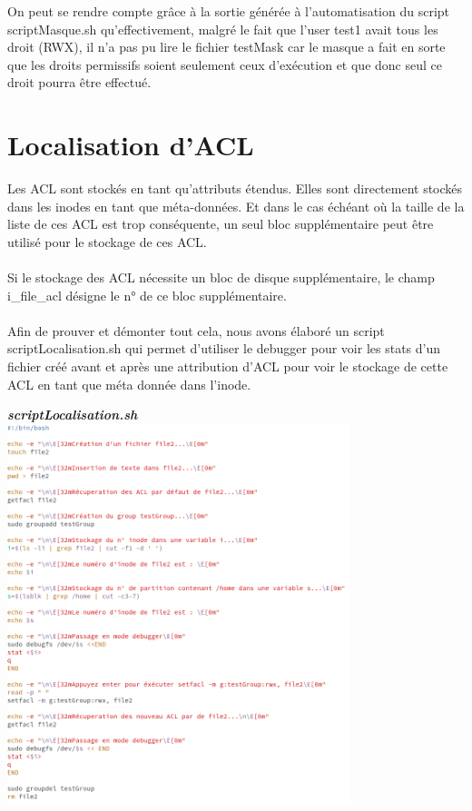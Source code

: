 \documentclass{article}
\begin{document}
On peut se rendre compte grâce à la sortie générée à l'automatisation du script scriptMasque.sh qu'effectivement, malgré le fait que l'user test1 avait tous les droit (RWX), il n'a pas pu lire le fichier testMask car le masque a fait en sorte que les droits permissifs soient seulement ceux d'exécution et que donc seul ce droit pourra être effectué.
\newpage
\section{Localisation d'ACL}
Les ACL sont stockés en tant qu'attributs étendus. Elles sont directement stockés dans les inodes en tant que méta-données. Et dans le cas échéant où la taille de la liste de ces ACL est trop conséquente, un seul bloc supplémentaire peut être utilisé pour le stockage de ces ACL.\\\\
Si le stockage des ACL nécessite un bloc de disque supplémentaire, le champ i\_file\_acl désigne le n° de ce bloc supplémentaire.\\\\
Afin de prouver et démonter tout cela, nous avons élaboré un script scriptLocalisation.sh qui permet d'utiliser le debugger pour voir les stats d'un fichier créé avant et après une attribution d'ACL pour voir le stockage de cette ACL en tant que méta donnée dans l'inode.
\begin{center}
    \textbf{\textit{scriptLocalisation.sh}}
\includegraphics[width=10cm]{images/scriptLocalisation.png}
\end{center}
\end{document}
